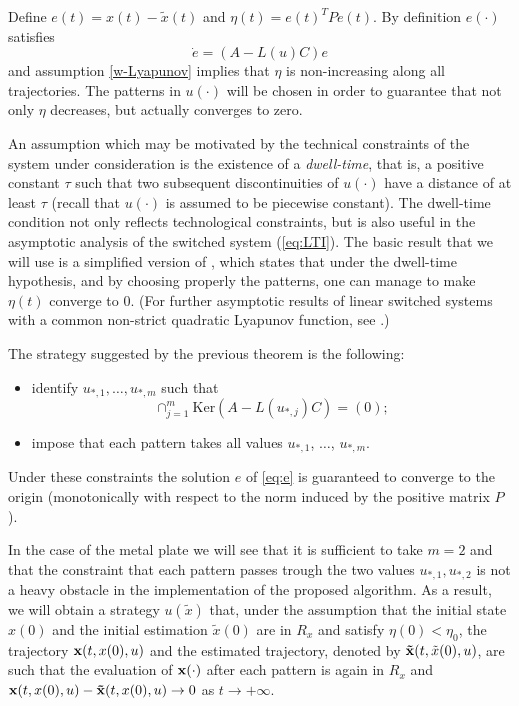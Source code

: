 Define $e(t)=  x(t) - \tilde x(t)$ and  $\eta(t)= e(t)^T P e(t)$. By definition $e(\cdot)$ satisfies 
\begin{equation}\label{eq:augmented_sys}
\dot e= (A-L(u)C)e
\label{eq:e}
\end{equation}
and assumption \eqref{w-Lyapunov} implies that $\eta$ is non-increasing along all trajectories.
The patterns in $u(\cdot)$ will be chosen in order to guarantee that not only $\eta$ decreases, but actually converges to zero. 



An assumption which may be motivated by the technical constraints of the system under consideration
is the existence of a \emph{dwell-time}, that is, a positive constant $\tau$ such that two subsequent
discontinuities of $u(\cdot)$ have a distance of at least $\tau$ (recall that $u(\cdot)$ is assumed to 
be piecewise constant). 
The dwell-time condition not only reflects technological constraints, 
but is also useful in the asymptotic analysis of the switched system (\ref{eq:LTI}). 
The basic result that we will use is a simplified version of 
\cite[Theorem II.5]{serres2011convergence}, which states that under the dwell-time hypothesis,
and by choosing properly the patterns, one can manage to make $\eta(t)$
converge to $0$.
(For further asymptotic results of linear switched systems with a common non-strict 
quadratic Lyapunov function, see \cite{Moussa-Jouan2011,Riedinger-Sigalotti-Daafouz2010}.)


The strategy suggested by the previous theorem is the following: 
\begin{itemize}
\item identify $u_{*,1},\dots,u_{*,m}$ such that 
\[ \cap_{j=1}^m \mathrm{Ker}(A-L(u_{*,j})C)=(0); \]
\item impose that each pattern takes all values $u_{*,1}$, $\dots$, $u_{*,m}$.
\end{itemize}

Under these constraints the solution $e$ of \eqref{eq:e} is guaranteed to converge to the origin (monotonically with respect to the norm induced by the positive matrix $P$). 



In the case of the metal plate we will see that it is sufficient to take $m=2$ and that 
the constraint that each pattern passes trough the two values $u_{*,1},u_{*,2}$ is 
not a heavy obstacle in the implementation of the proposed algorithm. 
As a result, we will obtain a strategy $u(\tilde x)$ that, under the assumption that the
initial state $x(0)$ and the initial estimation $\tilde x(0)$ are in $R_x$
and satisfy $\eta(0)<\eta_0$, the trajectory 
${\bf x}(t,x(0),u)$ and the estimated trajectory, denoted by ${\bf \tilde x}(t,\tilde x(0),u)$, are 
such that the evaluation of ${\bf x}(\cdot)$ after each pattern is again in $R_x$ and 
${\bf x}(t,x(0),u)- {\bf \tilde x}(t,x(0),u)\to 0$ as $t\to+\infty$. 

